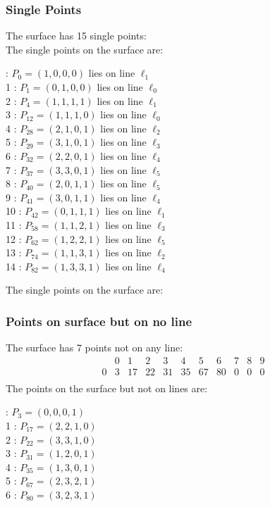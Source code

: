\documentclass{article}
\begin{document}
{\subsubsection*{Single Points}
The surface has 15 single points:\\
The single points on the surface are:\\
\begin{multicols}{2}
 : $P_{0}=( 1, 0, 0, 0 )$ lies on line $\ell_{1}$\\
1 : $P_{1}=( 0, 1, 0, 0 )$ lies on line $\ell_{0}$\\
2 : $P_{4}=( 1, 1, 1, 1 )$ lies on line $\ell_{1}$\\
3 : $P_{12}=( 1, 1, 1, 0 )$ lies on line $\ell_{0}$\\
4 : $P_{28}=( 2, 1, 0, 1 )$ lies on line $\ell_{2}$\\
5 : $P_{29}=( 3, 1, 0, 1 )$ lies on line $\ell_{3}$\\
6 : $P_{32}=( 2, 2, 0, 1 )$ lies on line $\ell_{4}$\\
7 : $P_{37}=( 3, 3, 0, 1 )$ lies on line $\ell_{5}$\\
8 : $P_{40}=( 2, 0, 1, 1 )$ lies on line $\ell_{5}$\\
9 : $P_{41}=( 3, 0, 1, 1 )$ lies on line $\ell_{4}$\\
10 : $P_{42}=( 0, 1, 1, 1 )$ lies on line $\ell_{1}$\\
11 : $P_{58}=( 1, 1, 2, 1 )$ lies on line $\ell_{3}$\\
12 : $P_{62}=( 1, 2, 2, 1 )$ lies on line $\ell_{5}$\\
13 : $P_{74}=( 1, 1, 3, 1 )$ lies on line $\ell_{2}$\\
14 : $P_{82}=( 1, 3, 3, 1 )$ lies on line $\ell_{4}$\\
\end{multicols}
The single points on the surface are:\\
\subsubsection*{Points on surface but on no line}
The surface has 7 points not on any line:\\
$$
\begin{array}{r|*{10}{r}}
 & 0 & 1 & 2 & 3 & 4 & 5 & 6 & 7 & 8 & 9\\
\hline
0 & 3 & 17 & 22 & 31 & 35 & 67 & 80 & 0 & 0 & 0\\
\end{array}
$$
The points on the surface but not on lines are:\\
\begin{multicols}{2}
 : $P_{3}=( 0, 0, 0, 1 )$\\
1 : $P_{17}=( 2, 2, 1, 0 )$\\
2 : $P_{22}=( 3, 3, 1, 0 )$\\
3 : $P_{31}=( 1, 2, 0, 1 )$\\
4 : $P_{35}=( 1, 3, 0, 1 )$\\
5 : $P_{67}=( 2, 3, 2, 1 )$\\
6 : $P_{80}=( 3, 2, 3, 1 )$\\
\end{multicols}
}
\end{document}
